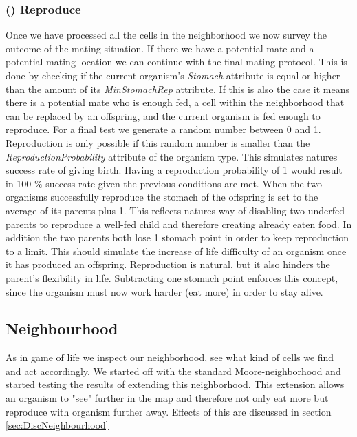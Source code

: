 \documentclass[11pt]{article}
\begin{document}
\addtocounter{protocolCounter}{1}
\subsubsection{() Reproduce}
\label{tab:reproduction}
Once we have processed all the cells in the neighborhood we now survey the outcome of the mating situation. If there we have a potential mate and a potential mating location we can continue with the final mating protocol. This is done by checking if the current organism's {\it Stomach} attribute is equal or higher than the amount of its {\it MinStomachRep} attribute. If this is also the case it means there is a potential mate who is enough fed, a cell within the neighborhood that can be replaced by an offspring, and the current organism is fed enough to reproduce. For a final test we generate a random number between 0 and 1. Reproduction is only possible if this random number is smaller than the {\it ReproductionProbability} attribute of the organism type. This simulates natures success rate of giving birth. Having a reproduction probability of 1 would result in 100 $\%$ success rate given the previous conditions are met. When the two organisms successfully reproduce the stomach of the offspring is set to the average of its parents plus 1. This reflects natures way of disabling two underfed parents to reproduce a well-fed child and therefore creating already eaten food. In addition the two parents both lose 1 stomach point in order to keep reproduction to a limit. This should simulate the increase of life difficulty of an organism once it has produced an offspring. Reproduction is natural, but it also hinders the parent's flexibility in life. Subtracting one stomach point enforces this concept, since the organism must now work harder (eat more) in order to stay alive.

\subsection{Neighbourhood}
\label{sec:neighbourhood}
As in game of life we inspect our neighborhood, see what kind of cells we find and act accordingly. 
We started off with the standard Moore-neighborhood and started testing the results of extending this neighborhood. This extension allows an organism to "see" further in the map and therefore not only eat more but reproduce with organism further away. Effects of this are discussed in section \ref{sec:DiscNeighbourhood}
\end{document}
